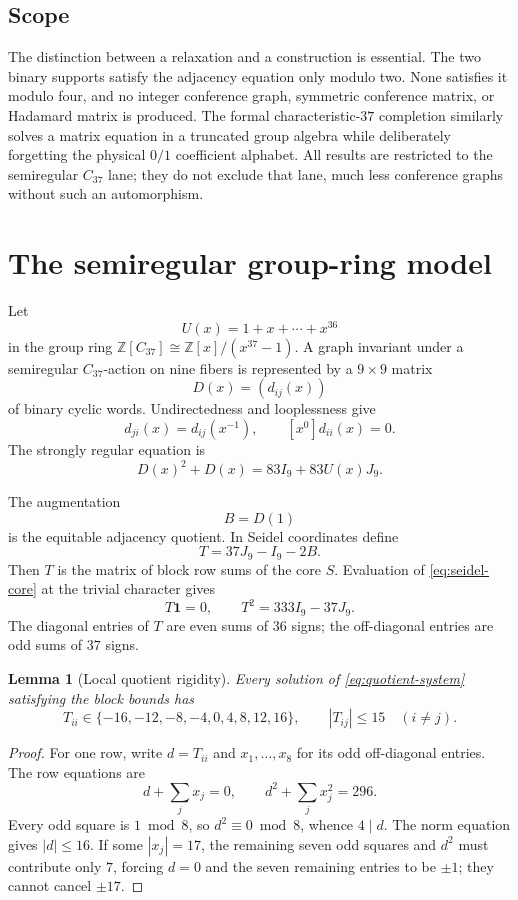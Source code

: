 \documentclass[11pt]{article}
\newtheorem{lemma}[theorem]{Lemma}
\theoremstyle{definition}
\newcommand{\Z}{\mathbb{Z}}
\newcommand{\one}{\mathbf{1}}
\begin{document}
\subsection*{Scope}

The distinction between a relaxation and a construction is essential.
The two binary supports satisfy the adjacency equation only modulo two.
None satisfies it modulo four, and no integer conference graph, symmetric
conference matrix, or Hadamard matrix is produced.  The formal
characteristic-\(37\) completion similarly solves a matrix equation in a
truncated group algebra while deliberately forgetting the physical
\(0/1\) coefficient alphabet.  All results are restricted to the
semiregular \(C_{37}\) lane; they do not exclude that lane, much less
conference graphs without such an automorphism.

\section{The semiregular group-ring model}
\label{sec:model}

Let
\[
 U(x)=1+x+\cdots+x^{36}
\]
in the group ring \(\Z[C_{37}]\cong\Z[x]/(x^{37}-1)\).  A graph invariant
under a semiregular \(C_{37}\)-action on nine fibers is represented by a
\(9\times9\) matrix
\[
 D(x)=(d_{ij}(x))
\]
of binary cyclic words.  Undirectedness and looplessness give
\[
 d_{ji}(x)=d_{ij}(x^{-1}),\qquad [x^0]d_{ii}(x)=0.
 \tag{2.1}\label{eq:star-symmetry}
\]
The strongly regular equation is
\[
 D(x)^2+D(x)=83I_9+83U(x)J_9.
 \tag{2.2}\label{eq:group-ring-srg}
\]

The augmentation
\[
 B=D(1)
\]
is the equitable adjacency quotient.  In Seidel coordinates define
\[
 T=37J_9-I_9-2B.
 \tag{2.3}\label{eq:T-from-B}
\]
Then \(T\) is the matrix of block row sums of the core \(S\).  Evaluation
of \eqref{eq:seidel-core} at the trivial character gives
\[
 T\one=0,\qquad T^2=333I_9-37J_9.
 \tag{2.4}\label{eq:quotient-system}
\]
The diagonal entries of \(T\) are even sums of \(36\) signs; the
off-diagonal entries are odd sums of \(37\) signs.

\begin{lemma}[Local quotient rigidity]
\label{lem:local-rigidity}
Every solution of \eqref{eq:quotient-system} satisfying the block bounds
has
\[
 T_{ii}\in\{-16,-12,-8,-4,0,4,8,12,16\},
 \qquad |T_{ij}|\leq15\quad(i\neq j).
\]
\end{lemma}

\begin{proof}
For one row, write \(d=T_{ii}\) and \(x_1,\ldots,x_8\) for its odd
off-diagonal entries.  The row equations are
\[
 d+\sum_jx_j=0,\qquad d^2+\sum_jx_j^2=296.
\]
Every odd square is \(1\bmod8\), so \(d^2\equiv0\bmod8\), whence
\(4\mid d\).  The norm equation gives \(|d|\leq16\).  If some
\(|x_j|=17\), the remaining seven odd squares and \(d^2\) must contribute
only \(7\), forcing \(d=0\) and the seven remaining entries to be
\(\pm1\); they cannot cancel \(\pm17\).
\end{proof}
\end{document}
